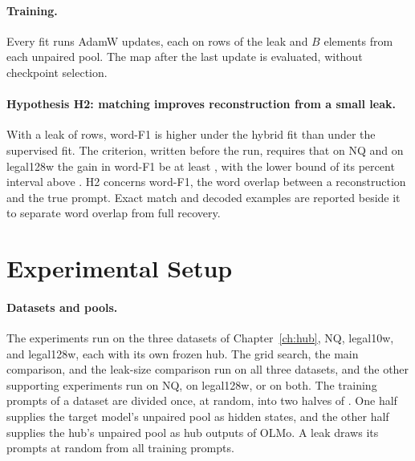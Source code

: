 \paragraph{Training.} Every fit runs  AdamW updates, each on  rows of the leak and $B$ elements from each unpaired pool. %
The map after the last update is evaluated, without checkpoint selection.

\paragraph{Hypothesis H2: matching improves reconstruction from a small leak.}\label{sec:attack:hypotheses}
With a leak of  rows, word-F1 is higher under the hybrid fit than under the supervised fit.
The criterion, written before the run, requires that on NQ and on legal128w the gain in word-F1 be at least , with the lower bound of its  percent interval above . %
H2 concerns word-F1, the word overlap between a reconstruction and the true prompt.
Exact match and decoded examples are reported beside it to separate word overlap from full recovery.

\section{Experimental Setup}\label{sec:attack:experiments}

\paragraph{Datasets and pools.} The experiments run on the three datasets of Chapter~\ref{ch:hub}, NQ, legal10w, and legal128w, each with its own frozen hub.
The grid search, the main comparison, and the leak-size comparison run on all three datasets, and the other supporting experiments run on NQ, on legal128w, or on both.
The  training prompts of a dataset are divided once, at random, into two halves of .
One half supplies the target model's unpaired pool as hidden states, and the other half supplies the hub's unpaired pool as hub outputs of OLMo. 
A leak draws its prompts at random from all  training prompts. 

